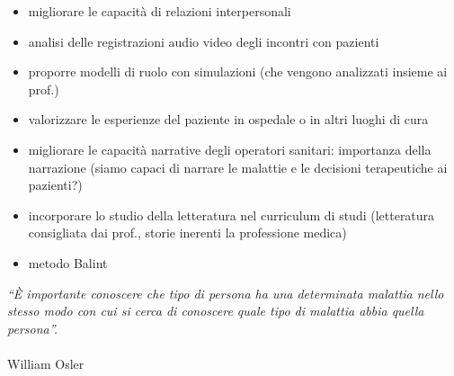 \begin{itemize}
\item
  migliorare le capacità di relazioni interpersonali
\item
  analisi delle registrazioni audio video degli incontri con pazienti
\item
  proporre modelli di ruolo con simulazioni (che vengono analizzati
  insieme ai prof.)
\item
  valorizzare le esperienze del paziente in ospedale o in altri luoghi
  di cura
\item
  migliorare le capacità narrative degli operatori sanitari: importanza
  della narrazione (siamo capaci di narrare le malattie e le decisioni
  terapeutiche ai pazienti?)
\item
  incorporare lo studio della letteratura nel curriculum di studi
  (letteratura consigliata dai prof., storie inerenti la professione
  medica)
\item
  metodo Balint
\end{itemize}

\emph{``È importante conoscere che tipo di persona ha una determinata
malattia nello stesso modo con cui si cerca di conoscere quale tipo di
malattia abbia quella persona''.}
\\\\
William Osler